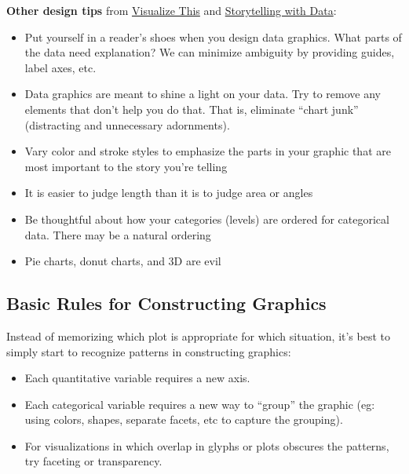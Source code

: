 \documentclass[
  letterpaper,
  DIV=11,
  numbers=noendperiod]{scrreprt}
\providecommand{\tightlist}{%
  \setlength{\itemsep}{0pt}\setlength{\parskip}{0pt}}\usepackage{longtable,booktabs,array}
\begin{document}
\textbf{Other design tips} from
\href{https://www.amazon.com/Visualize-This-FlowingData-Visualization-Statistics/dp/0470944889/}{Visualize
This} and
\href{https://www.amazon.com/Storytelling-Data-Visualization-Business-Professionals/dp/1119002257}{Storytelling
with Data}:

\begin{itemize}
\tightlist
\item
  Put yourself in a reader's shoes when you design data graphics. What
  parts of the data need explanation? We can minimize ambiguity by
  providing guides, label axes, etc.
\item
  Data graphics are meant to shine a light on your data. Try to remove
  any elements that don't help you do that. That is, eliminate ``chart
  junk'' (distracting and unnecessary adornments).
\item
  Vary color and stroke styles to emphasize the parts in your graphic
  that are most important to the story you're telling
\item
  It is easier to judge length than it is to judge area or angles
\item
  Be thoughtful about how your categories (levels) are ordered for
  categorical data. There may be a natural ordering
\item
  Pie charts, donut charts, and 3D are evil
\end{itemize}

\subsection*{Basic Rules for Constructing
Graphics}\label{basic-rules-for-constructing-graphics}

Instead of memorizing which plot is appropriate for which situation,
it's best to simply start to recognize patterns in constructing
graphics:

\begin{itemize}
\tightlist
\item
  Each quantitative variable requires a new axis.\\
\item
  Each categorical variable requires a new way to ``group'' the graphic
  (eg: using colors, shapes, separate facets, etc to capture the
  grouping).
\item
  For visualizations in which overlap in glyphs or plots obscures the
  patterns, try faceting or transparency.
\end{itemize}
\end{document}
